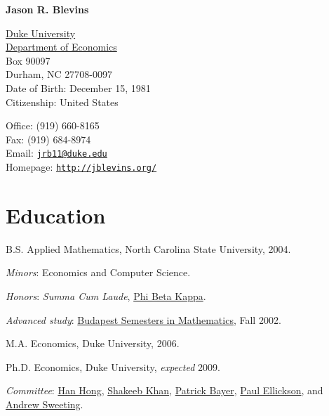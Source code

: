 \documentclass[letterpaper]{article}
\def\name{Jason R. Blevins}
\renewenvironment{itemize}{
  \begin{list}{}{
    \setlength{\leftmargin}{1em}
  }
}{
  \end{list}
}
\begin{document}
\centerline{\huge\bf \name}

\vspace{0.25in}

\begin{minipage}[t]{0.5\textwidth}
  \href{http://www.duke.edu/}{Duke University} \\
  \href{http://www.econ.duke.edu/}{Department of Economics} \\
  Box 90097 \\
  Durham, NC 27708-0097 \\
  Date of Birth: December 15, 1981 \\
  Citizenship: United States
\end{minipage}
\begin{minipage}[t]{0.5\textwidth}
  Office: (919) 660-8165 \\
  Fax: (919) 684-8974 \\
  Email: \href{mailto:jrb11@duke.edu}{\tt jrb11@duke.edu} \\
  Homepage: \href{http://jblevins.org/}{\tt http://jblevins.org/} \\
\end{minipage}

\section*{Education}

\begin{itemize}
  \item B.S. Applied Mathematics, North Carolina State University, 2004.
    \begin{itemize}
    \item \textit{Minors}: Economics and Computer Science.
    \item \textit{Honors}: \textit{Summa Cum Laude},
      \href{http://www.pbk.org/}{Phi Beta Kappa}.
    \item \textit{Advanced study}:
      \href{http://www.stolaf.edu/depts/math-old/budapest/}{Budapest
        Semesters in Mathematics}, Fall 2002.
    \end{itemize}

  \item M.A. Economics, Duke University, 2006.

  \item Ph.D. Economics, Duke University, \textit{expected} 2009.
    \begin{itemize}
    \item \textit{Committee}:
      \href{http://www.stanford.edu/~doubleh/}{Han Hong},
      \href{http://www.econ.duke.edu/~shakeebk/}{Shakeeb Khan},
      \href{http://www.econ.duke.edu/~pb29/}{Patrick Bayer},
      \href{http://www.econ.duke.edu/~paule/}{Paul Ellickson}, and
      \href{http://www.econ.duke.edu/~atsweet/}{Andrew Sweeting}.
    \end{itemize}
\end{itemize}
\end{document}
